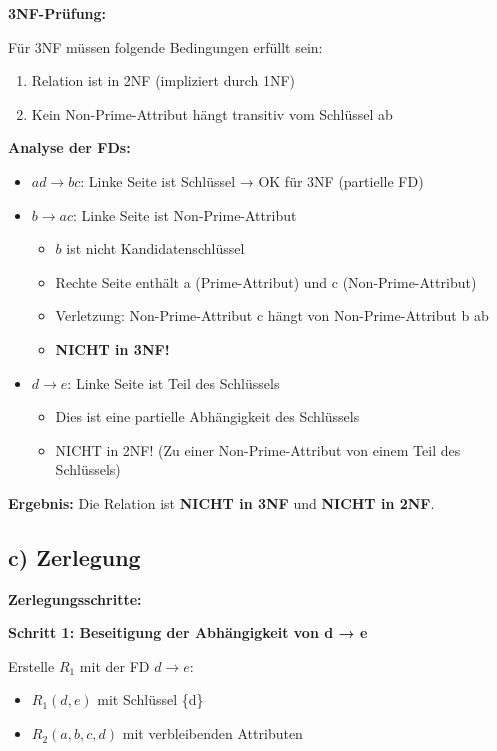 \documentclass[12pt,a4paper]{article}
\begin{document}
\textbf{3NF-Prüfung:}

Für 3NF müssen folgende Bedingungen erfüllt sein:
\begin{enumerate}
    \item Relation ist in 2NF (impliziert durch 1NF)
    \item Kein Non-Prime-Attribut hängt transitiv vom Schlüssel ab
\end{enumerate}

\textbf{Analyse der FDs:}
\begin{itemize}
    \item $ad \to bc$: Linke Seite ist Schlüssel → OK für 3NF (partielle FD)
    \item $b \to ac$: Linke Seite ist Non-Prime-Attribut
    \begin{itemize}
        \item $b$ ist nicht Kandidatenschlüssel
        \item Rechte Seite enthält a (Prime-Attribut) und c (Non-Prime-Attribut)
        \item Verletzung: Non-Prime-Attribut c hängt von Non-Prime-Attribut b ab
        \item \textbf{NICHT in 3NF!}
    \end{itemize}
    \item $d \to e$: Linke Seite ist Teil des Schlüssels
    \begin{itemize}
        \item Dies ist eine partielle Abhängigkeit des Schlüssels
        \item NICHT in 2NF! (Zu einer Non-Prime-Attribut von einem Teil des Schlüssels)
    \end{itemize}
\end{itemize}

\textbf{Ergebnis:} Die Relation ist \textbf{NICHT in 3NF} und \textbf{NICHT in 2NF}.

\subsection*{c) Zerlegung}

\textbf{Zerlegungsschritte:}

\textbf{Schritt 1: Beseitigung der Abhängigkeit von d → e}

Erstelle $R_1$ mit der FD $d \to e$:
\begin{itemize}
    \item $R_1(d, e)$ mit Schlüssel \{d\}
    \item $R_2(a, b, c, d)$ mit verbleibenden Attributen
\end{itemize}
\end{document}

